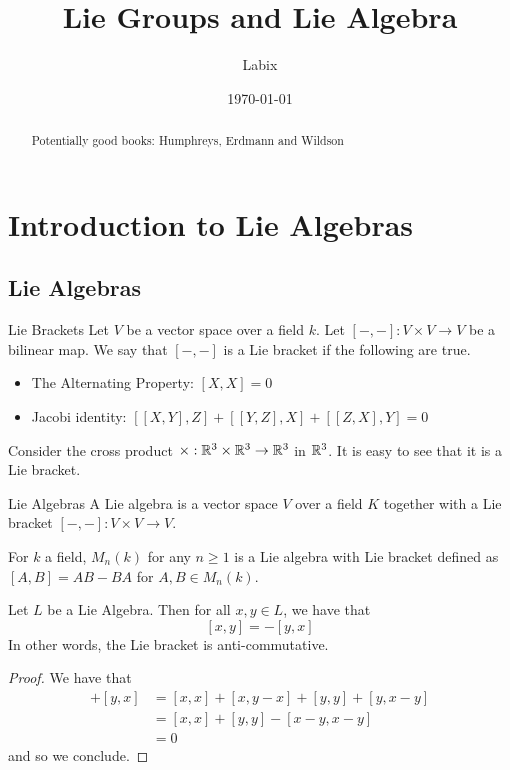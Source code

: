 \documentclass[a4paper]{article}
\title{Lie Groups and Lie Algebra}
\author{Labix}
\date{\today}
\begin{document}
\maketitle
\begin{abstract}
Potentially good books: Humphreys, Erdmann and Wildson
\end{abstract}
\pagebreak
\tableofcontents
\pagebreak

\section{Introduction to Lie Algebras}
\subsection{Lie Algebras}
\begin{defn}{Lie Brackets}{} Let $V$ be a vector space over a field $k$. Let $[-,-]:V\times V\to V$ be a bilinear map. We say that $[-,-]$ is a Lie bracket if the following are true. 
\begin{itemize}
\item The Alternating Property: $[X,X]=0$
\item Jacobi identity: $[[X,Y],Z]+[[Y,Z],X]+[[Z,X],Y]=0$
\end{itemize}
\end{defn}

Consider the cross product $\times:\mathbb{R}^3\times\mathbb{R}^3\to\mathbb{R}^3$ in $\mathbb{R}^3$. It is easy to see that it is a Lie bracket. 

\begin{defn}{Lie Algebras}{} A Lie algebra is a vector space $V$ over a field $K$ together with a Lie bracket $[-,-]:V\times V\to V$. 
\end{defn}

For $k$ a field, $M_n(k)$ for any $n\geq 1$ is a Lie algebra with Lie bracket defined as $[A,B]=AB-BA$ for $A,B\in M_n(k)$. 

\begin{lmm}{}{} Let $L$ be a Lie Algebra. Then for all $x,y\in L$, we have that $$[x,y]=-[y,x]$$ In other words, the Lie bracket is anti-commutative. 
\begin{proof}
We have that 
\begin{align*}
[x,y]+[y,x]&=[x,x]+[x,y-x]+[y,y]+[y,x-y]\tag{Bilinearity}\\
&=[x,x]+[y,y]-[x-y,x-y]\tag{Bilinearity}\\
&=0\tag{Alternating}
\end{align*}
and so we conclude. 
\end{proof}
\end{lmm}
\end{document}
